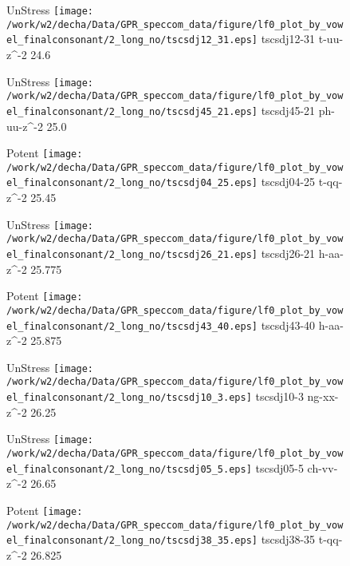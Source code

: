 \documentclass{article}
\begin{document}
\begin{figure}[t]
\begin{minipage}[b]{.24\textwidth}
UnStress
\centering
\texttt{[image: /work/w2/decha/Data/GPR\_speccom\_data/figure/lf0\_plot\_by\_vowel\_finalconsonant/2\_long\_no/tscsdj12\_31.eps]}
tscsdj12-31 t-uu-z\textasciicircum-2 24.6
\end{minipage}
\begin{minipage}[b]{.24\textwidth}
UnStress
\centering
\texttt{[image: /work/w2/decha/Data/GPR\_speccom\_data/figure/lf0\_plot\_by\_vowel\_finalconsonant/2\_long\_no/tscsdj45\_21.eps]}
tscsdj45-21 ph-uu-z\textasciicircum-2 25.0
\end{minipage}
\begin{minipage}[b]{.24\textwidth}
\colorbox{Apricot}{Potent}
\centering
\texttt{[image: /work/w2/decha/Data/GPR\_speccom\_data/figure/lf0\_plot\_by\_vowel\_finalconsonant/2\_long\_no/tscsdj04\_25.eps]}
tscsdj04-25 t-qq-z\textasciicircum-2 25.45
\end{minipage}
\begin{minipage}[b]{.24\textwidth}
UnStress
\centering
\texttt{[image: /work/w2/decha/Data/GPR\_speccom\_data/figure/lf0\_plot\_by\_vowel\_finalconsonant/2\_long\_no/tscsdj26\_21.eps]}
tscsdj26-21 h-aa-z\textasciicircum-2 25.775
\end{minipage}
\end{figure}

\begin{figure}[t]
\begin{minipage}[b]{.24\textwidth}
\colorbox{Apricot}{Potent}
\centering
\texttt{[image: /work/w2/decha/Data/GPR\_speccom\_data/figure/lf0\_plot\_by\_vowel\_finalconsonant/2\_long\_no/tscsdj43\_40.eps]}
tscsdj43-40 h-aa-z\textasciicircum-2 25.875
\end{minipage}
\begin{minipage}[b]{.24\textwidth}
UnStress
\centering
\texttt{[image: /work/w2/decha/Data/GPR\_speccom\_data/figure/lf0\_plot\_by\_vowel\_finalconsonant/2\_long\_no/tscsdj10\_3.eps]}
tscsdj10-3 ng-xx-z\textasciicircum-2 26.25
\end{minipage}
\begin{minipage}[b]{.24\textwidth}
UnStress
\centering
\texttt{[image: /work/w2/decha/Data/GPR\_speccom\_data/figure/lf0\_plot\_by\_vowel\_finalconsonant/2\_long\_no/tscsdj05\_5.eps]}
tscsdj05-5 ch-vv-z\textasciicircum-2 26.65
\end{minipage}
\begin{minipage}[b]{.24\textwidth}
\colorbox{Apricot}{Potent}
\centering
\texttt{[image: /work/w2/decha/Data/GPR\_speccom\_data/figure/lf0\_plot\_by\_vowel\_finalconsonant/2\_long\_no/tscsdj38\_35.eps]}
tscsdj38-35 t-qq-z\textasciicircum-2 26.825
\end{minipage}
\end{figure}
\end{document}
